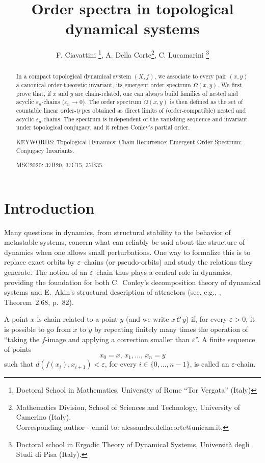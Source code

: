 \documentclass[10pt,a4paper]{article}
\author{F. Ciavattini \footnote{Doctoral School in Mathematics, University of Rome ``Tor Vergata'' (Italy)}, 
A. Della Corte\footnote{Mathematics Division, School of Sciences and Technology, University of Camerino (Italy). 
\\ Corresponding author - email to: alessandro.dellacorte@unicam.it.}, 
C. Lucamarini \footnote{Doctoral school in Ergodic Theory of Dynamical Systems, Università degli Studi di Pisa (Italy).}
}
\title{Order spectra in topological dynamical systems}
\theoremstyle{definition}
\theoremstyle{remark}
\theoremstyle{plain}
\begin{document}
\maketitle

\begin{abstract}
\noindent In a compact topological dynamical system $(X,f)$, we associate to every pair $(x,y)$ a canonical order-theoretic invariant, its emergent order spectrum $\Omega(x,y)$. We first prove that, if $x$ and $y$ are chain-related, one can always build families of nested and acyclic $\varepsilon_n$-chains ($\varepsilon_n \to 0$). The order spectrum $\Omega(x,y)$ is then defined as the set of countable linear order-types obtained as direct limits of (order-compatible) nested and acyclic $\varepsilon_n$-chains. The spectrum is independent of the vanishing sequence and invariant under topological conjugacy, and it refines Conley’s partial order.


\noindent KEYWORDS: Topological Dynamics; Chain Recurrence; Emergent Order Spectrum; Conjugacy Invariants.

\noindent MSC2020: 37B20, 37C15, 37B35.
\end{abstract}



\section{Introduction}

Many questions in dynamics, from structural stability to the behavior of metastable systems, concern what can reliably be said about the structure of dynamics when one allows small perturbations. One way to formalize this is to replace exact orbits by $\varepsilon$–chains (or pseudo-orbits) and study the relations they generate. The notion of an $\varepsilon$–chain thus plays a central role in dynamics, providing the foundation for both  C.~Conley’s decomposition theory of dynamical systems \cite{co78} and E.~Akin’s structural description of attractors (see, e.g., \cite{kurka03}, Theorem~2.68, p.~82).

A point $x$ is chain-related to a point $y$ (and we write $x\,\mathcal{C}\,y$) if, for every $\varepsilon>0$, it is possible to go from $x$ to $y$ by repeating finitely many times the operation of ``taking the $f$-image and applying a correction smaller than $\varepsilon$''. A finite sequence of points
$$x_0=x,\,x_1,\dots,\,x_n=y$$
such that $d(f(x_i),x_{i+1})<\varepsilon$, for every $i\in\{0,\dots,n-1\}$, is called an $\varepsilon$-chain.
\end{document}
